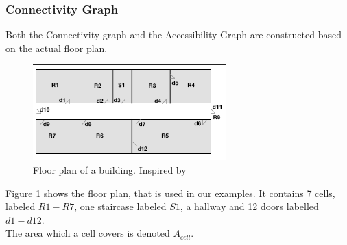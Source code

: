 \subsubsection{ \qquad Connectivity Graph}
Both the Connectivity graph and the Accessibility Graph are constructed based on the actual floor plan. 

\begin{figure}[]%
\centering
\includegraphics[width=0.8\columnwidth]{images/floorplan.png}%
\caption{Floor plan of a building. Inspired by~\cite{Jensen:2009:GMB:1590953.1591000}}%
\label{fig:floortplan}%
\end{figure}%

Figure \ref{fig:floortplan} shows the floor plan, that is used in our examples.
It contains 7 cells, labeled $R1 - R7$, one staircase labeled $S1$, a hallway and 12 doors labelled $d1-d12$. \\
The area which a cell covers is denoted $A_{cell}$.

